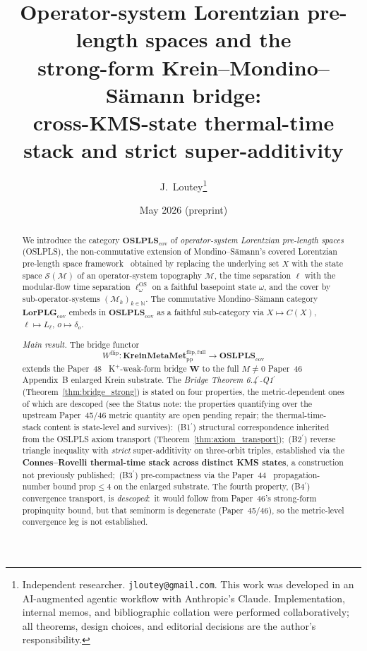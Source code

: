\documentclass[11pt,a4paper]{article}
\title{Operator-system Lorentzian pre-length spaces and the\\
strong-form Krein--Mondino--S\"amann bridge:\\
cross-KMS-state thermal-time stack and strict super-additivity}
\author{J.~Loutey\thanks{Independent researcher. \texttt{jloutey@gmail.com}.
This work was developed in an AI-augmented agentic workflow with
Anthropic's Claude. Implementation, internal memos, and bibliographic
collation were performed collaboratively; all theorems, design choices,
and editorial decisions are the author's responsibility.}}
\date{May 2026 (preprint)}
\theoremstyle{plain}
\theoremstyle{definition}
\newcommand{\Scal}{\mathcal{S}}
\newcommand{\Mcal}{\mathcal{M}}
\newcommand{\N}{\mathbb{N}}
\newcommand{\Wfun}{\mathbf{W}}
\newcommand{\LorPLG}{\mathbf{LorPLG}_{\mathrm{cov}}}
\newcommand{\OSLPLS}{\mathbf{OSLPLS}_{\mathrm{cov}}}
\newcommand{\KreinMMflip}{\mathbf{KreinMetaMet}_{\mathrm{pp}}^{\mathrm{flip},\mathrm{full}}}
\newcommand{\ellOS}{\ell^{\mathrm{OS}}}
\newcommand{\Wflip}{W^{\mathrm{flip}}}
\begin{document}
\maketitle

\begin{abstract}
We introduce the category $\OSLPLS$ of \emph{operator-system Lorentzian
pre-length spaces} (OSLPLS), the non-commutative extension of
Mondino--S\"amann's covered Lorentzian pre-length space
framework~\cite{mondino_samann2025_pointed} obtained by replacing the
underlying set $X$ with the state space $\Scal(\Mcal)$ of an
operator-system topography $\Mcal$, the time separation $\ell$ with the
modular-flow time separation $\ellOS_{\omega}$ on a faithful basepoint
state $\omega$, and the cover by sub-operator-systems
$(\Mcal_{k})_{k\in\N}$. The commutative Mondino--S\"amann category
$\LorPLG$ embeds in $\OSLPLS$ as a faithful sub-category via
$X\mapsto C(X)$, $\ell\mapsto L_{\ell}$, $o\mapsto\delta_{o}$.

\medskip

\noindent\emph{Main result.} The bridge functor
\[
  \Wflip:\KreinMMflip\longrightarrow\OSLPLS
\]
extends the Paper~48~\cite{paper48} K$^{+}$-weak-form bridge $\Wfun$ to
the full $M\ne 0$ Paper~46~\cite{paper46} Appendix~B enlarged Krein
substrate. The \emph{Bridge Theorem 6.4$^{\prime}$-Q1$^{\prime}$}
(Theorem~\ref{thm:bridge_strong}) is stated on four properties, the
metric-dependent ones of which are descoped (see the Status note: the
properties quantifying over the upstream Paper~45/46 metric quantity are
open pending repair; the thermal-time-stack content is state-level and
survives):\ (B1$^{\prime}$) structural
correspondence inherited
from the OSLPLS axiom transport (Theorem~\ref{thm:axiom_transport});\
(B2$^{\prime}$) reverse triangle inequality with \emph{strict}
super-additivity on three-orbit triples, established via the
\textbf{Connes--Rovelli thermal-time stack across distinct KMS states},
a construction not previously published;\ (B3$^{\prime}$)
pre-compactness via the Paper~44~\cite{paper44} propagation-number
bound $\mathrm{prop}\le 4$ on the enlarged substrate.  The fourth
property, (B4$^{\prime}$) convergence transport, is \emph{descoped}:\
it would follow from Paper~46's strong-form propinquity bound, but that
seminorm is degenerate (Paper~45/46), so the metric-level convergence
leg is not established.

\medskip


\end{abstract}
\end{document}
